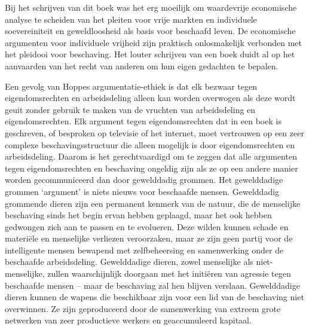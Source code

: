 Bij het schrijven van dit boek was het erg moeilijk om waardevrije economische analyse te scheiden van het pleiten voor vrije markten en individuele soevereiniteit en geweldloosheid als basis voor beschaafd leven. De economische argumenten voor individuele vrijheid zijn praktisch onlosmakelijk verbonden met het pleidooi voor beschaving. Het louter schrijven van een boek duidt al op het aanvaarden van het recht van anderen om hun eigen gedachten te bepalen.

Een gevolg van Hoppe\textquotesingle s argumentatie-ethiek is dat elk bezwaar tegen eigendomsrechten en arbeidsdeling alleen kan worden overwogen als deze wordt geuit zonder gebruik te maken van de vruchten van arbeidsdeling en eigendomsrechten. Elk argument tegen eigendomsrechten dat in een boek is geschreven, of besproken op televisie of het internet, moet vertrouwen op een zeer complexe beschavingsstructuur die alleen mogelijk is door eigendomsrechten en arbeidsdeling. Daarom is het gerechtvaardigd om te zeggen dat alle argumenten tegen eigendomsrechten en beschaving ongeldig zijn als ze op een andere manier worden gecommuniceerd dan door gewelddadig grommen. Het gewelddadige grommen `argument' is niets nieuws voor beschaafde mensen. Gewelddadig grommende dieren zijn een permanent kenmerk van de natuur, die de menselijke beschaving sinds het begin ervan hebben geplaagd, maar het ook hebben gedwongen zich aan te passen en te evolueren. Deze wilden kunnen schade en materiële en menselijke verliezen veroorzaken, maar ze zijn geen partij voor de intelligente mensen bewapend met zelfbeheersing en samenwerking onder de beschaafde arbeidsdeling. Gewelddadige dieren, zowel menselijke als niet-menselijke, zullen waarschijnlijk doorgaan met het initiëren van agressie tegen beschaafde mensen -- maar de beschaving zal hen blijven verslaan. Gewelddadige dieren kunnen de wapens die beschikbaar zijn voor een lid van de beschaving niet overwinnen. Ze zijn geproduceerd door de samenwerking van extreem grote netwerken van zeer productieve werkers en geaccumuleerd kapitaal.

